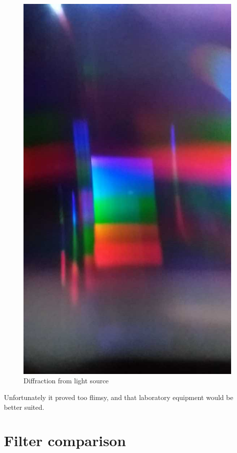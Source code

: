 \begin{appendices}
\begin{figure}[H]
\centering
\includegraphics[scale=0.4]{images/spectrum.jpg}
\caption{Diffraction from light source}
\label{fig:diffraction}
\end{figure}

Unfortunately it proved too flimsy, and that laboratory equipment would be better suited.


\chapter{Filter comparison}
\label{app:filter_comparison}


\end{appendices}
